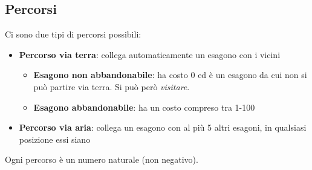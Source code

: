 \documentclass{article}
\begin{document}
\subsection{Percorsi}
Ci sono due tipi di percorsi possibili:
\begin{itemize}
    \item \textbf{Percorso via terra}: collega automaticamente un esagono con i vicini
    \begin{itemize}
        \item \textbf{Esagono non abbandonabile}: ha costo 0 ed è un esagono da cui non si può partire via terra. Si può però \textit{visitare}.
        \item \textbf{Esagono abbandonabile}: ha un costo compreso tra 1-100
    \end{itemize}
    \item \textbf{Percorso via aria}: collega un esagono con al più 5 altri esagoni, in qualsiasi posizione essi siano
\end{itemize}
Ogni percorso è un numero naturale (non negativo).

\vspace{2em}
\end{document}

